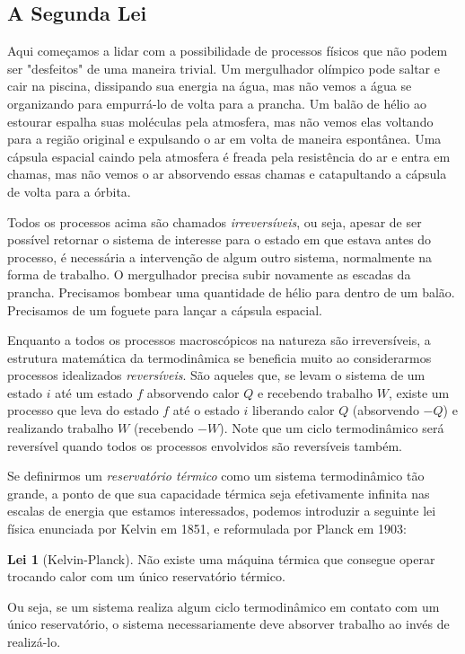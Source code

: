\documentclass[a4paper, 12pt]{article}
\theoremstyle{definition}
\theoremstyle{definition}
\newtheorem{law}{Lei}
\begin{document}
\subsection{A Segunda Lei}

Aqui começamos a lidar com a possibilidade de processos físicos que não podem ser "desfeitos" de uma
maneira trivial. Um mergulhador olímpico pode saltar e cair na piscina, dissipando sua energia na água,
mas não vemos a água se organizando para empurrá-lo de volta para a prancha. Um balão de hélio ao estourar
espalha suas moléculas pela atmosfera, mas não vemos elas voltando para a região original e expulsando
o ar em volta de maneira espontânea. Uma cápsula espacial caindo pela atmosfera é freada pela resistência 
do ar e entra em chamas, mas não vemos o ar absorvendo essas chamas e catapultando a cápsula de volta para
a órbita. 

Todos os processos acima são chamados \textit{irreversíveis}, ou seja, apesar de ser possível retornar o 
sistema de interesse para o estado em que estava antes do processo, é necessária a intervenção de algum outro
sistema, normalmente na forma de trabalho. O mergulhador precisa subir novamente as escadas da prancha.
Precisamos bombear uma quantidade de hélio para dentro de um balão. Precisamos de um foguete para lançar a
cápsula espacial. 

Enquanto a todos os processos macroscópicos na natureza são irreversíveis, a estrutura matemática da
termodinâmica se beneficia muito ao considerarmos processos idealizados \textit{reversíveis}. São aqueles que,
se levam o sistema de um estado $i$ até um estado $f$ absorvendo calor $Q$ e recebendo trabalho $W$, existe
um processo que leva do estado $f$ até o estado $i$ liberando calor $Q$ (absorvendo $-Q$) e realizando 
trabalho $W$ (recebendo $-W$). Note que um ciclo termodinâmico será reversível quando todos os
processos envolvidos são reversíveis também.

Se definirmos um \textit{reservatório térmico} como um sistema termodinâmico tão grande, a ponto de que
sua capacidade térmica seja efetivamente infinita nas escalas de energia que estamos interessados, podemos
introduzir a seguinte lei física enunciada por Kelvin em 1851, e reformulada por Planck em 1903:
\begin{law}[Kelvin-Planck]
    Não existe uma máquina térmica que consegue operar trocando calor com um único reservatório térmico.
\end{law}
Ou seja, se um sistema realiza algum ciclo termodinâmico em contato com um único reservatório, o sistema
necessariamente deve absorver trabalho ao invés de realizá-lo.
\end{document}
